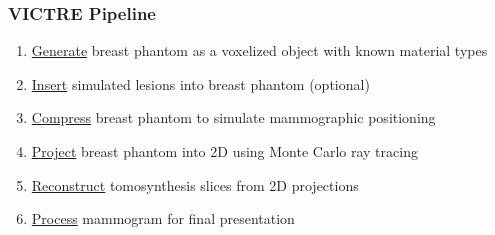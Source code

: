 \documentclass[12pt]{beamer}
\begin{document}
\begin{frame}
\frametitle{VICTRE Pipeline}
\begin{enumerate}
    \item \underline{Generate} breast phantom as a voxelized object with known material types
    \item \underline{Insert} simulated lesions into breast phantom (optional)
    \item \underline{Compress} breast phantom to simulate mammographic positioning
    \item \underline{Project} breast phantom into 2D using Monte Carlo ray tracing
    \item \underline{Reconstruct} tomosynthesis slices from 2D projections
    \item \underline{Process} mammogram for final presentation
\end{enumerate}
\vspace{1cm}
\begin{figure}[h!]
\centering

\end{figure}
\end{frame}
\end{document}
